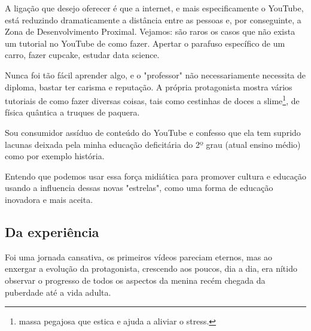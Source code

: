A ligação que desejo oferecer é que a internet, e mais especificamente o YouTube, está reduzindo dramaticamente a distância entre as pessoas e, por conseguinte, a Zona de Desenvolvimento Proximal. Vejamos: são raros os casos que não exista um tutorial no YouTube de como fazer. Apertar o parafuso específico de um carro, fazer cupcake, estudar data science.

Nunca foi tão fácil aprender algo, e o "professor"  não necessariamente necessita de diploma, bastar ter carisma e reputação. A própria protagonista mostra vários tutoriais de como fazer diversas coisas, tais como cestinhas de doces a slime\footnote{ massa pegajosa que estica e ajuda a aliviar o stress.}, de física quântica a truques de paquera.

Sou consumidor assíduo de conteúdo do YouTube e confesso que ela tem suprido lacunas deixada pela minha educação deficitária do 2º grau (atual ensino médio) como por exemplo história.

Entendo que podemos usar essa força midiática para promover cultura e educação usando a influencia dessas novas "estrelas", como uma forma de educação inovadora e mais aceita.

\subsection{Da experiência}

Foi uma jornada cansativa, os primeiros vídeos pareciam eternos, mas ao enxergar a evolução da protagonista, crescendo aos poucos, dia a dia, era nítido observar o progresso de todos os aspectos da menina recém chegada da puberdade até a vida adulta.